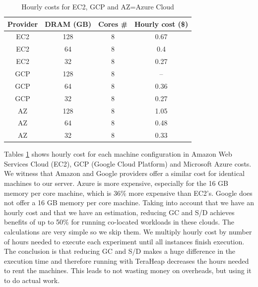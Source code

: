 \begin{table}[t!]
  \centering
  \caption{Hourly costs for EC2, GCP and AZ=Azure Cloud}
  \label{tab:cost_table}
  \begin{tabular}{|c|c|c|c|}
    \hline
	  \textbf{Provider} & \textbf{DRAM (GB)} & \textbf{Cores #} & \textbf{Hourly cost (\$)} \\
    \hline
	  EC2 & 128 & 8 & 0.67  \\
	  EC2 & 64 & 8 & 0.4 \\
	  EC2 & 32 & 8 & 0.27 \\
	  GCP & 128 & 8 & -- \\
	  GCP & 64 & 8 & 0.36 \\
	  GCP & 32 & 8 & 0.27 \\
	  AZ & 128 & 8 & 1.05 \\
	  AZ & 64 & 8 & 0.48 \\
	  AZ & 32 & 8 & 0.33 \\ 
	  \hline
  \end{tabular}
\end{table}


Tables \ref{tab:cost_table} shows hourly cost for each machine configuration in 
Amazon Web Services Cloud (EC2), GCP (Google Cloud Platform) and Microsoft Azure costs. 
We witness that Amazon and Google providers offer a similar cost for identical machines to our server.
Azure is more expensive, especially for the 16 GB memory per core machine, which is 36\% more expensive than EC2's.
Google does not offer a 16 GB memory per core machine.
Taking into account that we have an hourly cost and that we have an estimation,
reducing GC and S/D achieves benefits of up to 50\% for running co-located workloads in these clouds. The calculations are very simple so we skip them. We multiply hourly cost by number of hours needed to execute each experiment until all instances finish execution. The conclusion is that reducing GC and S/D makes a huge difference in the execution time and therefore running with TeraHeap decreases the hours needed to rent the machines. This leads to not wasting money on overheads, but using it to do actual work.


